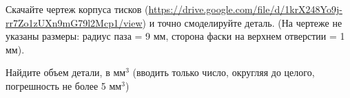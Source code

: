 
Скачайте чертеж корпуса тисков (\url{https://drive.google.com/file/d/1krX248Yo9j-rr7Zo1zUXn9mG79l2Mcp1/view}) и точно смоделируйте деталь.  
(На чертеже не указаны размеры:  радиус паза = 9 мм, 
сторона фаски на верхнем отверстии = 1 мм).


Найдите объем детали, в мм$^3$ (вводить только число, округляя до целого, погрешность не более 5 мм$^3$)

